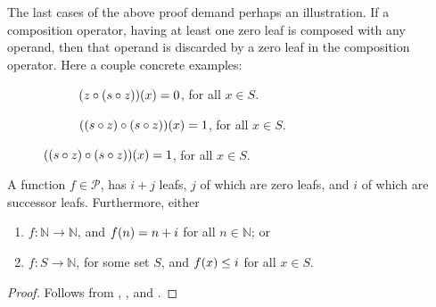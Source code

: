 The last cases of the above proof demand perhaps an illustration. If a
composition operator, having at least one zero leaf is composed with any
operand, then that operand is discarded by a zero leaf in the composition
operator. Here a couple concrete examples:

\begin{figure}[h!]
\centering
%
\begin{subfigure}{0.49\textwidth}
\centering
{}
\caption[]{${\mathopen{}\left({z \circ {\ensuremath{\mathopen{}\left({s \circ z}\right)\mathclose{}}}}\right)\mathclose{}}{\mathopen{}\left({x}\right)\mathclose{}} = 0$, for all $x \in S$.}
\end{subfigure}
%
\begin{subfigure}{0.49\textwidth}
\centering
{}
\caption[]{${\mathopen{}\left({{\mathopen{}\left({s \circ z}\right)\mathclose{}} \circ {\ensuremath{\mathopen{}\left({s \circ z}\right)\mathclose{}}}}\right)\mathclose{}}{\mathopen{}\left({x}\right)\mathclose{}} = 1$, for all $x \in S$.}
\end{subfigure}
%
\end{figure}


\begin{theorem} A function $f \in \mathcal{P}$, has $i+j$ leafs, $j$ of which
are zero leafs, and $i$ of which are successor leafs. Furthermore,
either\begin{enumerate}[label=(\arabic*)]

\item $f : \mathbb{N} \rightarrow \mathbb{N}$, and $f{\mathopen{}\left({n}\right)\mathclose{}} = n+i$ for all $n
\in \mathbb{N}$; or

\item $f : S \rightarrow \mathbb{N}$, for some set $S$, and $f{\mathopen{}\left({x}\right)\mathclose{}} \leq i$ for
all $x \in S$.

\end{enumerate}\end{theorem}

\begin{proof} Follows from , , and
. \end{proof}

